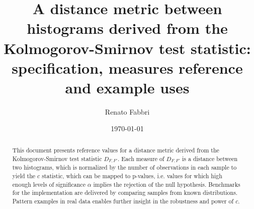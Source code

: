 \documentclass[%
	aip,
	jmp,%
	amsmath,amssymb,
	reprint,%
]{revtex4-1}
\begin{document}

\title[Distances between histograms]{A distance metric between histograms
derived from the Kolmogorov-Smirnov test statistic: specification, measures reference and example uses}%
\author{Renato Fabbri}%

\date{\today}%

\begin{abstract}
This document presents reference values for a distance metric
derived from the Kolmogorov-Smirnov test statistic $D_{F,F'}$.
Each measure of $D_{F,F'}$ is a distance between two histograms,
which is normalized by the number of observations in each sample
to yield the $c$ statistic, which can be mapped to p-values, i.e. values for which 
high enough levels of significance $\alpha$ implies the rejection of the null hypothesis.
Benchmarks for the implementation are delivered by comparing samples from known distributions.
Pattern examples in real data enables further
insight in the robustness and power of $c$.
\end{abstract}

\maketitle
\end{document}
